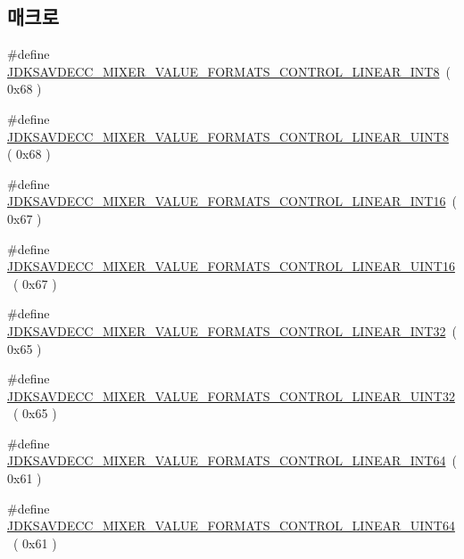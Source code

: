 \subsection*{매크로}
\begin{DoxyCompactItemize}
\item 
\#define \hyperlink{group__mixer__value__formats_ga2b4f0f24263c1b6381f7a03cdb269ee9}{J\+D\+K\+S\+A\+V\+D\+E\+C\+C\+\_\+\+M\+I\+X\+E\+R\+\_\+\+V\+A\+L\+U\+E\+\_\+\+F\+O\+R\+M\+A\+T\+S\+\_\+\+C\+O\+N\+T\+R\+O\+L\+\_\+\+L\+I\+N\+E\+A\+R\+\_\+\+I\+N\+T8}~( 0x68 )
\item 
\#define \hyperlink{group__mixer__value__formats_ga6acf7e40b99c975610cf63452c581e41}{J\+D\+K\+S\+A\+V\+D\+E\+C\+C\+\_\+\+M\+I\+X\+E\+R\+\_\+\+V\+A\+L\+U\+E\+\_\+\+F\+O\+R\+M\+A\+T\+S\+\_\+\+C\+O\+N\+T\+R\+O\+L\+\_\+\+L\+I\+N\+E\+A\+R\+\_\+\+U\+I\+N\+T8}~( 0x68 )
\item 
\#define \hyperlink{group__mixer__value__formats_gaeb21409c279faa82757fc207878ec8a9}{J\+D\+K\+S\+A\+V\+D\+E\+C\+C\+\_\+\+M\+I\+X\+E\+R\+\_\+\+V\+A\+L\+U\+E\+\_\+\+F\+O\+R\+M\+A\+T\+S\+\_\+\+C\+O\+N\+T\+R\+O\+L\+\_\+\+L\+I\+N\+E\+A\+R\+\_\+\+I\+N\+T16}~( 0x67 )
\item 
\#define \hyperlink{group__mixer__value__formats_gac9b089ce2866060a37d8fd636909f984}{J\+D\+K\+S\+A\+V\+D\+E\+C\+C\+\_\+\+M\+I\+X\+E\+R\+\_\+\+V\+A\+L\+U\+E\+\_\+\+F\+O\+R\+M\+A\+T\+S\+\_\+\+C\+O\+N\+T\+R\+O\+L\+\_\+\+L\+I\+N\+E\+A\+R\+\_\+\+U\+I\+N\+T16}~( 0x67 )
\item 
\#define \hyperlink{group__mixer__value__formats_ga0629aac192d7dffdfe353be23c291ec3}{J\+D\+K\+S\+A\+V\+D\+E\+C\+C\+\_\+\+M\+I\+X\+E\+R\+\_\+\+V\+A\+L\+U\+E\+\_\+\+F\+O\+R\+M\+A\+T\+S\+\_\+\+C\+O\+N\+T\+R\+O\+L\+\_\+\+L\+I\+N\+E\+A\+R\+\_\+\+I\+N\+T32}~( 0x65 )
\item 
\#define \hyperlink{group__mixer__value__formats_ga7ef6894ebf05e22a820aa549302141b1}{J\+D\+K\+S\+A\+V\+D\+E\+C\+C\+\_\+\+M\+I\+X\+E\+R\+\_\+\+V\+A\+L\+U\+E\+\_\+\+F\+O\+R\+M\+A\+T\+S\+\_\+\+C\+O\+N\+T\+R\+O\+L\+\_\+\+L\+I\+N\+E\+A\+R\+\_\+\+U\+I\+N\+T32}~( 0x65 )
\item 
\#define \hyperlink{group__mixer__value__formats_ga4adaa18eefd741b3ed7b7bdb227b1238}{J\+D\+K\+S\+A\+V\+D\+E\+C\+C\+\_\+\+M\+I\+X\+E\+R\+\_\+\+V\+A\+L\+U\+E\+\_\+\+F\+O\+R\+M\+A\+T\+S\+\_\+\+C\+O\+N\+T\+R\+O\+L\+\_\+\+L\+I\+N\+E\+A\+R\+\_\+\+I\+N\+T64}~( 0x61 )
\item 
\#define \hyperlink{group__mixer__value__formats_ga29c4591726c158db00281ce1cf550e91}{J\+D\+K\+S\+A\+V\+D\+E\+C\+C\+\_\+\+M\+I\+X\+E\+R\+\_\+\+V\+A\+L\+U\+E\+\_\+\+F\+O\+R\+M\+A\+T\+S\+\_\+\+C\+O\+N\+T\+R\+O\+L\+\_\+\+L\+I\+N\+E\+A\+R\+\_\+\+U\+I\+N\+T64}~( 0x61 )

\end{DoxyCompactItemize}
